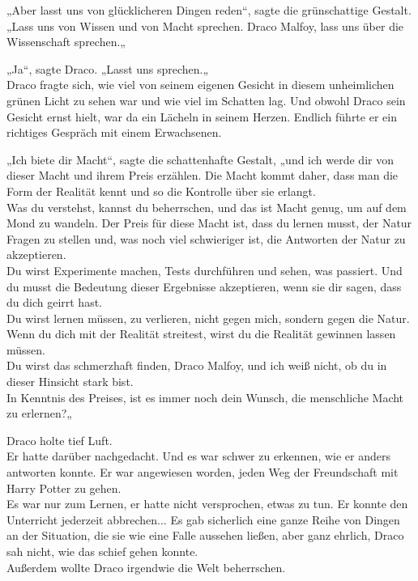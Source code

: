 {„Aber lasst uns von glücklicheren Dingen reden“, sagte die grünschattige Gestalt. „Lass uns von Wissen und von Macht sprechen. Draco Malfoy, lass uns über die Wissenschaft sprechen.„

„Ja“, sagte Draco. „Lasst uns sprechen.„\\ Draco fragte sich, wie viel von seinem eigenen Gesicht in diesem unheimlichen grünen Licht zu sehen war und wie viel im Schatten lag. Und obwohl Draco sein Gesicht ernst hielt, war da ein Lächeln in seinem Herzen. Endlich führte er ein richtiges Gespräch mit einem Erwachsenen.

„Ich biete dir Macht“, sagte die schattenhafte Gestalt, „und ich werde dir von dieser Macht und ihrem Preis erzählen. Die Macht kommt daher, dass man die Form der Realität kennt und so die Kontrolle über sie erlangt.\\ Was du verstehst, kannst du beherrschen, und das ist Macht genug, um auf dem Mond zu wandeln. Der Preis für diese Macht ist, dass du lernen musst, der Natur Fragen zu stellen und, was noch viel schwieriger ist, die Antworten der Natur zu akzeptieren.\\ Du wirst Experimente machen, Tests durchführen und sehen, was passiert. Und du musst die Bedeutung dieser Ergebnisse akzeptieren, wenn sie dir sagen, dass du dich geirrt hast.\\ Du wirst lernen müssen, zu verlieren, nicht gegen mich, sondern gegen die Natur.\\ Wenn du dich mit der Realität streitest, wirst du die Realität gewinnen lassen müssen.\\ Du wirst das schmerzhaft finden, Draco Malfoy, und ich weiß nicht, ob du in dieser Hinsicht stark bist.\\ In Kenntnis des Preises, ist es immer noch dein Wunsch, die menschliche Macht zu erlernen?„

Draco holte tief Luft.\\ Er hatte darüber nachgedacht. Und es war schwer zu erkennen, wie er anders antworten konnte. Er war angewiesen worden, jeden Weg der Freundschaft mit Harry Potter zu gehen.\\ Es war nur zum Lernen, er hatte nicht versprochen, etwas zu tun. Er konnte den Unterricht jederzeit abbrechen... Es gab sicherlich eine ganze Reihe von Dingen an der Situation, die sie wie eine Falle aussehen ließen, aber ganz ehrlich, Draco sah nicht, wie das schief gehen konnte.\\ Außerdem wollte Draco irgendwie die Welt beherrschen.

}
